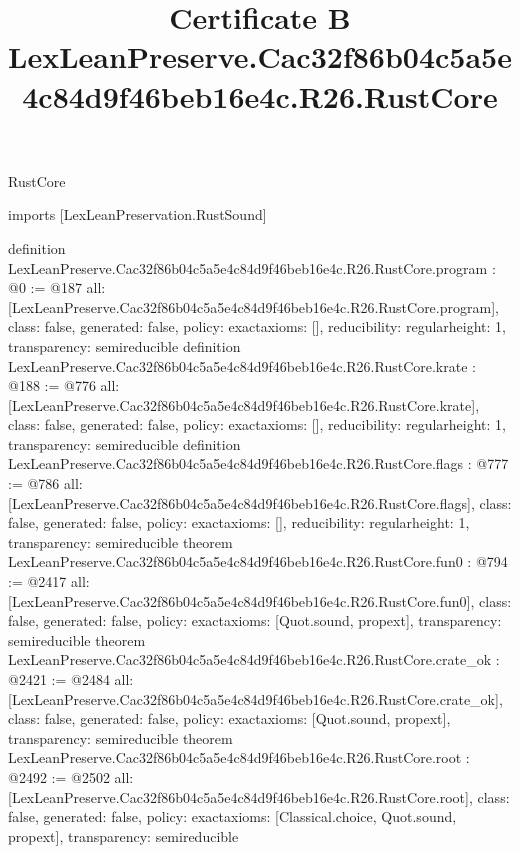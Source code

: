 \begin{lexlean}{RustCore}
\title{Certificate B LexLeanPreserve.Cac32f86b04c5a5e4c84d9f46beb16e4c.R26.RustCore}
\begin{coremodule}
imports [LexLeanPreservation.RustSound]

definition LexLeanPreserve.Cac32f86b04c5a5e4c84d9f46beb16e4c.R26.RustCore.program : @0 := @187 {
  all: [LexLeanPreserve.Cac32f86b04c5a5e4c84d9f46beb16e4c.R26.RustCore.program],
  class: false,
  generated: false,
  policy: exact{axioms: []},
  reducibility: regular{height: 1},
  transparency: semireducible
}
definition LexLeanPreserve.Cac32f86b04c5a5e4c84d9f46beb16e4c.R26.RustCore.krate : @188 := @776 {
  all: [LexLeanPreserve.Cac32f86b04c5a5e4c84d9f46beb16e4c.R26.RustCore.krate],
  class: false,
  generated: false,
  policy: exact{axioms: []},
  reducibility: regular{height: 1},
  transparency: semireducible
}
definition LexLeanPreserve.Cac32f86b04c5a5e4c84d9f46beb16e4c.R26.RustCore.flags : @777 := @786 {
  all: [LexLeanPreserve.Cac32f86b04c5a5e4c84d9f46beb16e4c.R26.RustCore.flags],
  class: false,
  generated: false,
  policy: exact{axioms: []},
  reducibility: regular{height: 1},
  transparency: semireducible
}
theorem LexLeanPreserve.Cac32f86b04c5a5e4c84d9f46beb16e4c.R26.RustCore.fun0 : @794 := @2417 {
  all: [LexLeanPreserve.Cac32f86b04c5a5e4c84d9f46beb16e4c.R26.RustCore.fun0],
  class: false,
  generated: false,
  policy: exact{axioms: [Quot.sound, propext]},
  transparency: semireducible
}
theorem LexLeanPreserve.Cac32f86b04c5a5e4c84d9f46beb16e4c.R26.RustCore.crate_ok : @2421 := @2484 {
  all: [LexLeanPreserve.Cac32f86b04c5a5e4c84d9f46beb16e4c.R26.RustCore.crate_ok],
  class: false,
  generated: false,
  policy: exact{axioms: [Quot.sound, propext]},
  transparency: semireducible
}
theorem LexLeanPreserve.Cac32f86b04c5a5e4c84d9f46beb16e4c.R26.RustCore.root : @2492 := @2502 {
  all: [LexLeanPreserve.Cac32f86b04c5a5e4c84d9f46beb16e4c.R26.RustCore.root],
  class: false,
  generated: false,
  policy: exact{axioms: [Classical.choice, Quot.sound, propext]},
  transparency: semireducible
}


\end{coremodule}
\end{lexlean}
